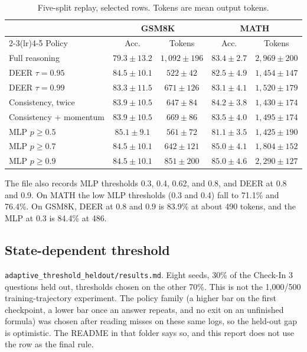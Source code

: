\begin{table}[!t]
\caption{Five-split replay, selected rows. Tokens are mean output tokens.}
\label{tab:mlp5}
\centering
\renewcommand{\arraystretch}{0.9}
\scriptsize
\begin{tabular}{@{}lcccc@{}}
\toprule
 & \multicolumn{2}{c}{GSM8K} & \multicolumn{2}{c}{MATH} \\
\cmidrule(lr){2-3}\cmidrule(lr){4-5}
Policy & Acc. & Tokens & Acc. & Tokens \\
\midrule
Full reasoning & $79.3\pm 13.2$ & $1{,}092\pm 196$ & $83.4\pm 2.7$ & $2{,}969\pm 200$ \\
DEER $\tau=0.95$ & $84.5\pm 10.1$ & $522\pm 42$ & $82.5\pm 4.9$ & $1{,}454\pm 147$ \\
DEER $\tau=0.99$ & $83.3\pm 11.5$ & $671\pm 126$ & $83.1\pm 4.1$ & $1{,}520\pm 179$ \\
Consistency, twice & $83.9\pm 10.5$ & $647\pm 84$ & $84.2\pm 3.8$ & $1{,}430\pm 174$ \\
Consistency + momentum & $83.9\pm 10.5$ & $669\pm 86$ & $83.5\pm 4.0$ & $1{,}495\pm 174$ \\
MLP $p\ge 0.5$ & $85.1\pm 9.1$ & $561\pm 72$ & $81.1\pm 3.5$ & $1{,}425\pm 190$ \\
MLP $p\ge 0.7$ & $84.5\pm 10.1$ & $642\pm 121$ & $85.0\pm 4.1$ & $1{,}804\pm 152$ \\
MLP $p\ge 0.9$ & $84.5\pm 10.1$ & $851\pm 200$ & $85.0\pm 4.6$ & $2{,}290\pm 127$ \\
\bottomrule
\end{tabular}
\end{table}

The file also records MLP thresholds 0.3, 0.4, 0.62, and 0.8, and DEER at 0.8 and 0.9.
On MATH the low MLP thresholds (0.3 and 0.4) fall to 71.1\% and 76.4\%.
On GSM8K, DEER at 0.8 and 0.9 is 83.9\% at about 490 tokens, and the MLP at 0.3 is 84.4\% at 486.

\subsection{State-dependent threshold}
\texttt{adaptive\_threshold\_heldout/results.md}.
Eight seeds, 30\% of the Check-In 3 questions held out, thresholds chosen on the other 70\%.
This is not the 1{,}000/500 training-trajectory experiment.
The policy family (a higher bar on the first checkpoint, a lower bar once an answer repeats, and no exit on an unfinished formula) was chosen after reading misses on these same logs, so the held-out gap is optimistic.
The README in that folder says so, and this report does not use the row as the final rule.

